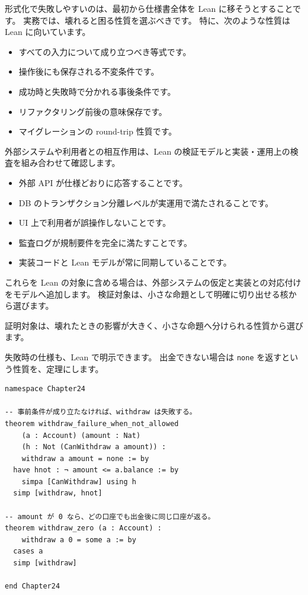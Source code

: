 形式化で失敗しやすいのは、最初から仕様書全体を Lean に移そうとすることです。
実務では、壊れると困る性質を選ぶべきです。
特に、次のような性質は Lean に向いています。

\begin{itemize}
\item すべての入力について成り立つべき等式です。
\item 操作後にも保存される不変条件です。
\item 成功時と失敗時で分かれる事後条件です。
\item リファクタリング前後の意味保存です。
\item マイグレーションの round-trip 性質です。
\end{itemize}

外部システムや利用者との相互作用は、Lean の検証モデルと実装・運用上の検査を組み合わせて確認します。

\begin{itemize}
\item 外部 API が仕様どおりに応答することです。
\item DB のトランザクション分離レベルが実運用で満たされることです。
\item UI 上で利用者が誤操作しないことです。
\item 監査ログが規制要件を完全に満たすことです。
\item 実装コードと Lean モデルが常に同期していることです。
\end{itemize}

これらを Lean の対象に含める場合は、外部システムの仮定と実装との対応付けをモデルへ追加します。
検証対象は、小さな命題として明確に切り出せる核から選びます。

証明対象は、壊れたときの影響が大きく、小さな命題へ分けられる性質から選びます。

失敗時の仕様も、Lean で明示できます。
出金できない場合は \texttt{none} を返すという性質を、定理にします。

\begin{listing}[htbp]
\begin{verbatim}
namespace Chapter24

-- 事前条件が成り立たなければ、withdraw は失敗する。
theorem withdraw_failure_when_not_allowed
    (a : Account) (amount : Nat)
    (h : Not (CanWithdraw a amount)) :
    withdraw a amount = none := by
  have hnot : ¬ amount <= a.balance := by
    simpa [CanWithdraw] using h
  simp [withdraw, hnot]

-- amount が 0 なら、どの口座でも出金後に同じ口座が返る。
theorem withdraw_zero (a : Account) :
    withdraw a 0 = some a := by
  cases a
  simp [withdraw]

end Chapter24
\end{verbatim}
\caption{\texttt{withdraw\_failure\_when\_not\_allowed}}
\label{lst:ch24-failure-spec}
\end{listing}

